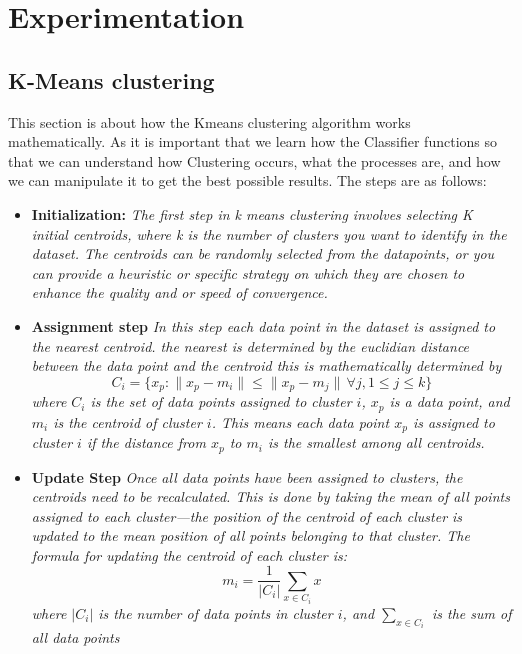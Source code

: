 \chapter{Experimentation}\label{ch:experimentation}


\section{K-Means clustering}\label{sec:k-means-clustering}

This section is about how the Kmeans clustering algorithm works mathematically.
As it is important that we learn how the Classifier functions so that we can understand how Clustering occurs,
what the processes are, and how we can manipulate it to get the best possible results.
The steps are as follows:

\begin{itemize}
    \item \textbf{Initialization:}
    \textit{The first step in k means clustering involves selecting K initial centroids, where k is the number of clusters
    you want to identify in the dataset.
    The centroids can be randomly selected from the datapoints, or you can provide a heuristic or specific strategy
    on which they are chosen to enhance the quality and or speed of convergence.}
    \item \textbf{ Assignment step}
    \textit{In this step each data point in the dataset is assigned to the nearest centroid.
    the nearest is determined by the euclidian distance between the data point and the centroid this is mathematically determined by
    \[
        C_i = \{ x_p : \|x_p - m_i\| \leq \|x_p - m_j\| \, \forall j, 1 \leq j \leq k \}
    \]}
    \textit{where $C_i$ is the set of data points assigned to cluster $i$, $x_p$ is a data point, and $m_i$ is the centroid
    of cluster $i$. This means each data point $x_p$ is assigned to cluster $i$ if the distance from $x_p$ to $m_i$ is the smallest
    among all centroids.}
    \item \textbf{Update Step}
    \textit{Once all data points have been assigned to clusters, the centroids need to be recalculated.
    This is done by taking the mean of all points assigned to each cluster—the position of the centroid of each cluster is updated
    to the mean position of all points belonging to that cluster. The formula for updating the centroid of each cluster is:
    \[
        m_i = \frac{1}{|C_i|} \sum_{x \in C_i} x
    \]}
    \textit{where $|C_i|$ is the number of data points in cluster $i$, and $\sum_{x \in C_i}$ is the sum of all data points
}
\end{itemize}
